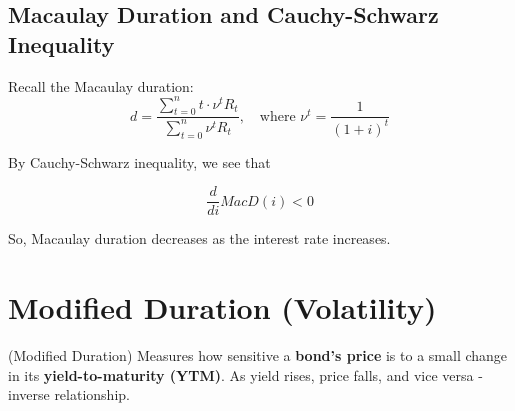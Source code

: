 \subsection{Macaulay Duration and Cauchy-Schwarz Inequality}
\begin{comments}

Recall the Macaulay duration:
\[
d = \frac{\sum_{t=0}^{n} t \cdot \nu^t R_t}{\sum_{t=0}^{n} \nu^t R_t}, \quad \text{where } \nu^t = \frac{1}{(1+i)^t}
\]

By Cauchy-Schwarz inequality, we see that

\[
\frac{d}{di} MacD(i) < 0
\]

So, Macaulay duration decreases as the interest rate increases.
\end{comments}












\section{Modified Duration (Volatility)}

\begin{definition} (Modified Duration)
    Measures how sensitive a \textbf{bond’s price} is to a small change in its \textbf{yield-to-maturity (YTM)}. 
    As yield rises, price falls, and vice versa - inverse relationship. 
\end{definition}

